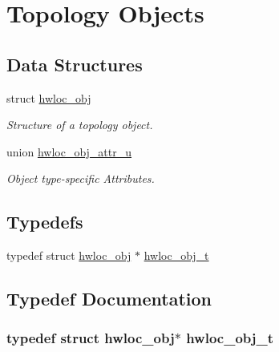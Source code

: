 \hypertarget{group__hwlocality__objects}{
\section{Topology Objects}
\label{group__hwlocality__objects}
}
\subsection*{Data Structures}
\begin{DoxyCompactItemize}
\item 
struct \hyperlink{structhwloc__obj}{hwloc\_\-obj}
\begin{DoxyCompactList}\small\item\em Structure of a topology object. \item\end{DoxyCompactList}\item 
union \hyperlink{unionhwloc__obj__attr__u}{hwloc\_\-obj\_\-attr\_\-u}
\begin{DoxyCompactList}\small\item\em Object type-\/specific Attributes. \item\end{DoxyCompactList}\end{DoxyCompactItemize}
\subsection*{Typedefs}
\begin{DoxyCompactItemize}
\item 
typedef struct \hyperlink{structhwloc__obj}{hwloc\_\-obj} $\ast$ \hyperlink{group__hwlocality__objects_ga79b8ab56877ef99ac59b833203391c7d}{hwloc\_\-obj\_\-t}
\end{DoxyCompactItemize}


\subsection{Typedef Documentation}
\hypertarget{group__hwlocality__objects_ga79b8ab56877ef99ac59b833203391c7d}{
\subsubsection[{hwloc\_\-obj\_\-t}]{\setlength{\rightskip}{0pt plus 5cm}typedef struct {\bf hwloc\_\-obj}$\ast$ {\bf hwloc\_\-obj\_\-t}}}
\label{group__hwlocality__objects_ga79b8ab56877ef99ac59b833203391c7d}
